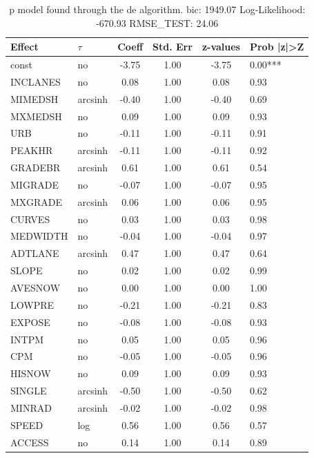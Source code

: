 \begin{table}
	\caption{p model found through the de algorithm. bic: 1949.07 Log-Likelihood: -670.93 RMSE_TEST: 24.06}
	\begin{center}
		\begin{tabular}{|l|l|c|c|c|l|}
			\hline
			Effect & $\tau$ & Coeff & Std. Err & z-values & Prob |z|>Z \\
			\hline
			const & no & -3.75 & 1.00 & -3.75 & 0.00*** \\
			\hline
			INCLANES & no & 0.08 & 1.00 & 0.08 & 0.93 \\
			\hline
			MIMEDSH & arcsinh & -0.40 & 1.00 & -0.40 & 0.69 \\
			\hline
			MXMEDSH & no & 0.09 & 1.00 & 0.09 & 0.93 \\
			\hline
			URB & no & -0.11 & 1.00 & -0.11 & 0.91 \\
			\hline
			PEAKHR & arcsinh & -0.11 & 1.00 & -0.11 & 0.92 \\
			\hline
			GRADEBR & arcsinh & 0.61 & 1.00 & 0.61 & 0.54 \\
			\hline
			MIGRADE & no & -0.07 & 1.00 & -0.07 & 0.95 \\
			\hline
			MXGRADE & arcsinh & 0.06 & 1.00 & 0.06 & 0.95 \\
			\hline
			CURVES & no & 0.03 & 1.00 & 0.03 & 0.98 \\
			\hline
			MEDWIDTH & no & -0.04 & 1.00 & -0.04 & 0.97 \\
			\hline
			ADTLANE & arcsinh & 0.47 & 1.00 & 0.47 & 0.64 \\
			\hline
			SLOPE & no & 0.02 & 1.00 & 0.02 & 0.99 \\
			\hline
			AVESNOW & no & 0.00 & 1.00 & 0.00 & 1.00 \\
			\hline
			LOWPRE & no & -0.21 & 1.00 & -0.21 & 0.83 \\
			\hline
			EXPOSE & no & -0.08 & 1.00 & -0.08 & 0.93 \\
			\hline
			INTPM & no & 0.05 & 1.00 & 0.05 & 0.96 \\
			\hline
			CPM & no & -0.05 & 1.00 & -0.05 & 0.96 \\
			\hline
			HISNOW & no & 0.09 & 1.00 & 0.09 & 0.93 \\
			\hline
			SINGLE & arcsinh & -0.50 & 1.00 & -0.50 & 0.62 \\
			\hline
			MINRAD & arcsinh & -0.02 & 1.00 & -0.02 & 0.98 \\
			\hline
			SPEED & log & 0.56 & 1.00 & 0.56 & 0.57 \\
			\hline
			ACCESS & no & 0.14 & 1.00 & 0.14 & 0.89 \\

\end{tabular}
\end{center}
\end{table}
